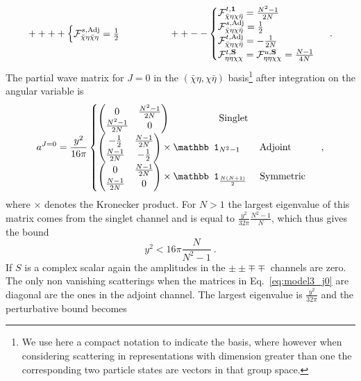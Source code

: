 \documentclass[a4paper,11pt]{article}
\newcommand{\be}{\begin{equation}}
\newcommand{\ee}{\end{equation}}
\begin{document}
\begin{align}\label{eq:group_model3_J0}
++++
\begin{cases}
{\cal F}^{s,{\rm Adj}}_{\bar \chi \eta \bar \chi \eta} = \frac{1}{2}
\end{cases}
%
\qquad \qquad
++--
\begin{cases}
{\cal F}^{t, \bf{1}}_{\bar \chi \eta  \chi \bar \eta} = \frac{N^2-1}{2N} \\
%
{\cal F}^{s, {\rm Adj}}_{\bar \chi \eta  \chi \bar \eta} = \frac{1}{2} \\
{\cal F}^{t, {\rm Adj}}_{\bar \chi \eta  \chi \bar \eta} = -\frac{1}{2N} \\
%
%
{\cal F}^{t,{\rm {\bf S}}}_{\eta\eta\chi\chi} = {\cal F}^{u,{\rm {\bf S}}}_{\eta\eta\chi\chi}  =\frac{N-1}{4N} \\
\end{cases} \ .
\end{align}
The partial wave matrix for $J=0$ in the $(\bar\chi \eta, \chi\bar \eta)$ basis\footnote{We use here a compact notation to indicate the basis, where however when considering scattering in representations with dimension greater than one the corresponding two particle states are vectors in that group space.} after integration on the angular variable is
\be\label{eq:model3_j0}
a^{J=0}=\frac{y^2}{16\pi}
\begin{cases}
\begin{pmatrix}
0 & \frac{N^2-1}{2N} \\
\frac{N^2-1}{2N} & 0
\end{pmatrix}\quad\quad\quad\quad\quad  {\rm Singlet} \\
%
\begin{pmatrix}
-\frac{1}{2} & \frac{N-1}{2N} \\
 \frac{N-1}{2N} & -\frac{1}{2}
\end{pmatrix}\times {\mathbb 1}_{N^2-1}\quad\quad {\rm Adjoint} \\
%
\begin{pmatrix}
0& \frac{N-1}{2N} \\
 \frac{N-1}{2N} & 0
\end{pmatrix} \times {\mathbb 1}_{\frac{N(N+1)}{2}}
\quad\,\, {\rm Symmetric}
\end{cases}
\ ,
\ee
where $\times$ denotes the Kronecker product.
For $N>1$ the largest eigenvalue of this matrix comes from the singlet channel and is equal to $\frac{y^2}{32\pi}\frac{N^2-1}{N}$, which thus gives the bound
\be
y^2 < 16\pi \frac{N}{N^2-1} \ .
\ee
If $S$ is a complex scalar again the amplitudes in the $\pm\pm\mp\mp$ channels are zero. The only non vanishing scatterings when the matrices in Eq.~\eqref{eq:model3_j0} are diagonal are the ones in the adjoint channel. The largest eigenvalue is $\frac{y^2}{32\pi}$ and the perturbative bound becomes
\end{document}
